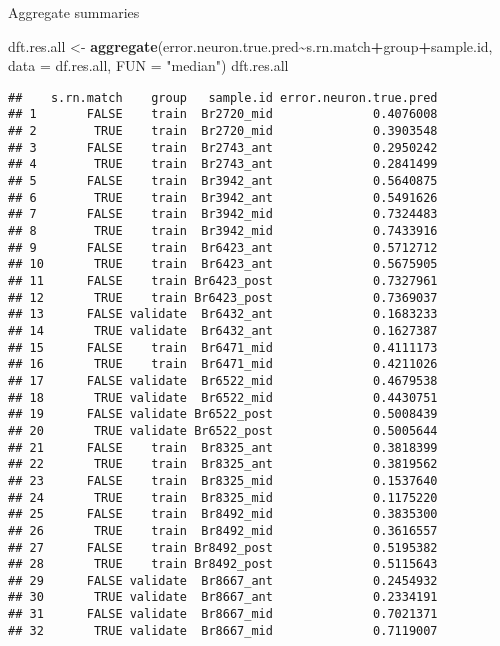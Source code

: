 \documentclass[
]{article}
\newenvironment{Shaded}{\begin{snugshade}}{\end{snugshade}}
\newcommand{\AttributeTok}[1]{\textcolor[rgb]{0.13,0.29,0.53}{#1}}
\newcommand{\FunctionTok}[1]{\textcolor[rgb]{0.13,0.29,0.53}{\textbf{#1}}}
\newcommand{\NormalTok}[1]{#1}
\newcommand{\OtherTok}[1]{\textcolor[rgb]{0.56,0.35,0.01}{#1}}
\newcommand{\SpecialCharTok}[1]{\textcolor[rgb]{0.81,0.36,0.00}{\textbf{#1}}}
\newcommand{\StringTok}[1]{\textcolor[rgb]{0.31,0.60,0.02}{#1}}
\begin{document}
Aggregate summaries

\begin{Shaded}
\begin{Highlighting}[]
\NormalTok{dft.res.all }\OtherTok{\textless{}{-}} \FunctionTok{aggregate}\NormalTok{(error.neuron.true.pred}\SpecialCharTok{\textasciitilde{}}\NormalTok{s.rn.match}\SpecialCharTok{+}\NormalTok{group}\SpecialCharTok{+}\NormalTok{sample.id, }
                         \AttributeTok{data =}\NormalTok{ df.res.all, }\AttributeTok{FUN =} \StringTok{"median"}\NormalTok{)}
\NormalTok{dft.res.all}
\end{Highlighting}
\end{Shaded}

\begin{verbatim}
##    s.rn.match    group   sample.id error.neuron.true.pred
## 1       FALSE    train  Br2720_mid              0.4076008
## 2        TRUE    train  Br2720_mid              0.3903548
## 3       FALSE    train  Br2743_ant              0.2950242
## 4        TRUE    train  Br2743_ant              0.2841499
## 5       FALSE    train  Br3942_ant              0.5640875
## 6        TRUE    train  Br3942_ant              0.5491626
## 7       FALSE    train  Br3942_mid              0.7324483
## 8        TRUE    train  Br3942_mid              0.7433916
## 9       FALSE    train  Br6423_ant              0.5712712
## 10       TRUE    train  Br6423_ant              0.5675905
## 11      FALSE    train Br6423_post              0.7327961
## 12       TRUE    train Br6423_post              0.7369037
## 13      FALSE validate  Br6432_ant              0.1683233
## 14       TRUE validate  Br6432_ant              0.1627387
## 15      FALSE    train  Br6471_mid              0.4111173
## 16       TRUE    train  Br6471_mid              0.4211026
## 17      FALSE validate  Br6522_mid              0.4679538
## 18       TRUE validate  Br6522_mid              0.4430751
## 19      FALSE validate Br6522_post              0.5008439
## 20       TRUE validate Br6522_post              0.5005644
## 21      FALSE    train  Br8325_ant              0.3818399
## 22       TRUE    train  Br8325_ant              0.3819562
## 23      FALSE    train  Br8325_mid              0.1537640
## 24       TRUE    train  Br8325_mid              0.1175220
## 25      FALSE    train  Br8492_mid              0.3835300
## 26       TRUE    train  Br8492_mid              0.3616557
## 27      FALSE    train Br8492_post              0.5195382
## 28       TRUE    train Br8492_post              0.5115643
## 29      FALSE validate  Br8667_ant              0.2454932
## 30       TRUE validate  Br8667_ant              0.2334191
## 31      FALSE validate  Br8667_mid              0.7021371
## 32       TRUE validate  Br8667_mid              0.7119007
\end{verbatim}
\end{document}
